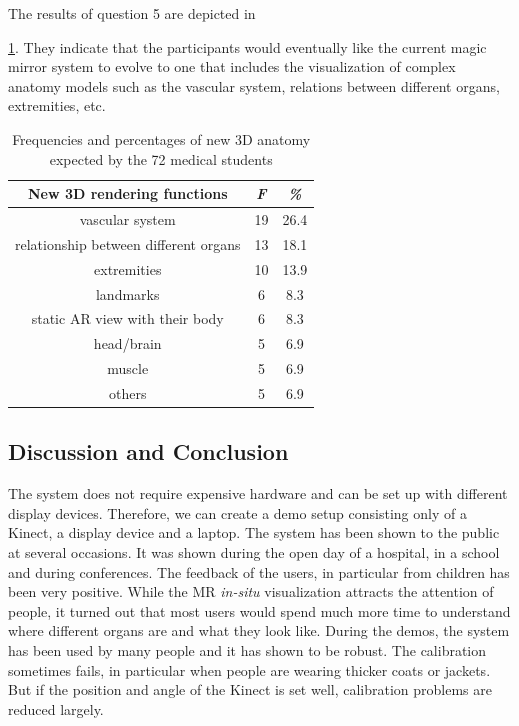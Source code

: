 {{{{{The results of question 5 are depicted in \tablename{\ref{tb:3-MMC:question5}. They indicate that the participants would eventually like the current magic mirror system to evolve to one that includes the visualization of complex anatomy models such as the vascular system, relations between different organs, extremities, etc. 
\begin{table}
	\caption[3D anatomy expected]{Frequencies and percentages of new 3D anatomy expected by the 72 medical students}
	\centering
	\label{tb:3-MMC:question5}
	\scriptsize
	\begin{center}
		\begin{tabular}{ccc}
			New 3D rendering functions & \textit{F} & \textit{\%} \\
			\hline
			vascular system &	19 &	26.4 \\
			relationship between different organs&	13	&18.1\\
			extremities &	10&	13.9\\
			landmarks&	6&	8.3\\
			static AR view with their body&	6	&8.3\\
			head/brain	&5	&6.9\\
			muscle&	5&	6.9\\
			others&	5&	6.9\\
			\hline
		\end{tabular}
	\end{center}
\end{table}

\subsection{Discussion and Conclusion}
The system does not require expensive hardware and can be set up with different display devices. Therefore, we can create a demo setup consisting only of a Kinect, a display device and a laptop. The system has been shown to the public at several occasions. It was shown during the open day of a hospital, in a school and during conferences. The feedback of the users, in particular from children has been very positive. While the MR \textit{in-situ} visualization attracts the attention of people, it turned out that most users would spend much more time to understand where different organs are and what they look like. During the demos, the system has been used by many people and it has shown to be robust. The calibration sometimes fails, in particular when people are wearing thicker coats or jackets. But if the position and angle of the Kinect is set well, calibration problems are reduced largely. 

}}}}}}
